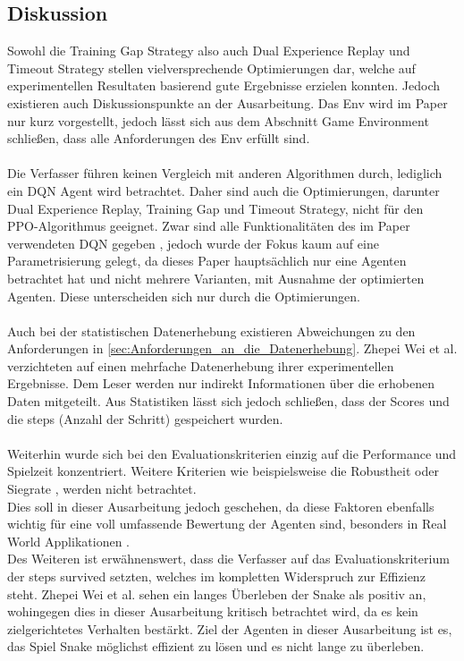 \subsection{Diskussion} \label{subsec:Verwandte_Arbeiten_Paper_1_Diskussion}
Sowohl die Training Gap Strategy also auch Dual Experience Replay und Timeout Strategy stellen vielversprechende Optimierungen dar, welche auf experimentellen Resultaten basierend gute Ergebnisse erzielen konnten. Jedoch existieren auch Diskussionspunkte an der Ausarbeitung.
Das Env wird im Paper nur kurz vorgestellt, jedoch lässt sich aus dem Abschnitt Game Environment schließen, dass alle Anforderungen des Env  erfüllt sind.\\
\\Die Verfasser führen keinen Vergleich mit anderen Algorithmen durch, lediglich ein DQN Agent wird betrachtet. 
Daher sind auch die Optimierungen, darunter Dual Experience Replay, Training Gap und Timeout Strategy, nicht für den PPO-Algorithmus geeignet. 
Zwar sind alle Funktionalitäten des im Paper verwendeten DQN gegeben , jedoch wurde der Fokus kaum auf eine Parametrisierung  gelegt, da dieses Paper hauptsächlich nur eine Agenten betrachtet hat und nicht mehrere Varianten, mit Ausnahme der optimierten Agenten. Diese unterscheiden sich nur durch die Optimierungen.\\
\\Auch bei der statistischen Datenerhebung existieren Abweichungen zu den Anforderungen in \autoref{sec:Anforderungen_an_die_Datenerhebung}. Zhepei Wei et al. verzichteten auf einen mehrfache Datenerhebung ihrer experimentellen Ergebnisse. Dem Leser werden nur indirekt Informationen über die erhobenen Daten mitgeteilt. Aus Statistiken lässt sich jedoch schließen, dass der Scores und die steps (Anzahl der Schritt) gespeichert wurden.\\
\\Weiterhin wurde sich bei den Evaluationskriterien einzig auf die Performance und Spielzeit konzentriert. Weitere Kriterien wie beispielsweise die Robustheit oder Siegrate , werden nicht betrachtet.\\
Dies soll in dieser Ausarbeitung jedoch geschehen, da diese Faktoren ebenfalls wichtig für eine voll umfassende Bewertung der Agenten sind, besonders in Real World Applikationen .\\ 
Des Weiteren ist erwähnenswert, dass die Verfasser auf das Evaluationskriterium der steps survived setzten, welches im kompletten Widerspruch zur Effizienz  steht. Zhepei Wei et al. sehen ein langes Überleben der Snake als positiv an, wohingegen dies in dieser Ausarbeitung kritisch betrachtet wird, da es kein zielgerichtetes Verhalten bestärkt. Ziel der Agenten in dieser Ausarbeitung ist es, das Spiel Snake möglichst effizient zu lösen und es nicht lange zu überleben.

